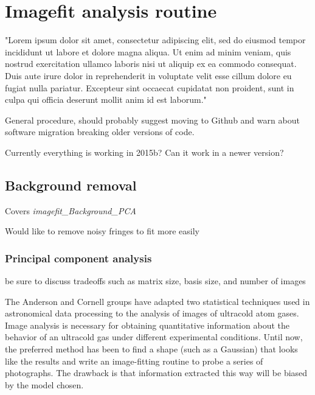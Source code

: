 \chapter{Imagefit analysis routine}
"Lorem ipsum dolor sit amet, consectetur adipiscing elit, sed do eiusmod tempor incididunt ut labore et dolore magna aliqua. Ut enim ad minim veniam, quis nostrud exercitation ullamco laboris nisi ut aliquip ex ea commodo consequat. Duis aute irure dolor in reprehenderit in voluptate velit esse cillum dolore eu fugiat nulla pariatur. Excepteur sint occaecat cupidatat non proident, sunt in culpa qui officia deserunt mollit anim id est laborum."

General procedure, should probably suggest moving to Github and warn about software migration breaking older versions of code.

Currently everything is working in 2015b? Can it work in a newer version?

\section{Background removal}

Covers \emph{imagefit\_Background\_PCA}

Would like to remove noisy fringes to fit more easily

\subsection{Principal component analysis}

be sure to discuss tradeoffs such as matrix size, basis size, and number of images

The Anderson and Cornell groups have adapted two statistical techniques used in astronomical data processing to the analysis of images of ultracold atom gases. Image analysis is necessary for obtaining quantitative information about the behavior of an ultracold gas under different experimental conditions. Until now, the preferred method has been to find a shape (such as a Gaussian) that looks like the results and write an image-fitting routine to probe a series of photographs. The drawback is that information extracted this way will be biased by the model chosen.

